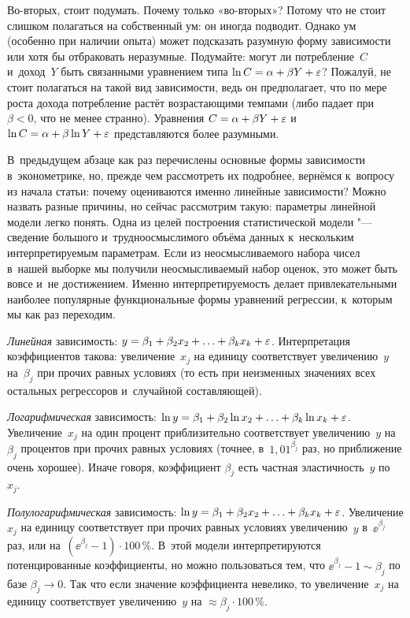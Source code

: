 \documentclass[11pt]{article}
\begin{document}
Во-вторых, стоит подумать. Почему только «во-вторых»? Потому что не стоит слишком полагаться на собственный ум: он иногда подводит. Однако ум (особенно при наличии опыта) может подсказать разумную форму зависимости или хотя бы отбраковать неразумные. Подумайте: могут ли потребление~$C$ и~доход~$Y$ быть связанными уравнением типа $\ln C = \alpha + \beta Y + \varepsilon$? Пожалуй, не стоит полагаться на такой вид зависимости, ведь он предполагает, что по мере роста дохода потребление растёт возрастающими темпами (либо падает при $\beta<0$, что не менее странно). Уравнения $C = \alpha + \beta Y + \varepsilon$ и~$\ln C = \alpha + \beta \ln Y + \varepsilon$ представляются более разумными.

В~предыдущем абзаце как раз перечислены основные формы зависимости в~эконометрике, но, прежде чем рассмотреть их подробнее, вернёмся к~вопросу из начала статьи: почему оцениваются именно линейные зависимости? Можно назвать разные причины, но сейчас рассмотрим такую: параметры линейной модели легко понять. Одна из целей построения статистической модели "--- сведение большого и~трудноосмыслимого объёма данных к~нескольким интерпретируемым параметрам. Если из неосмысливаемого набора чисел в~нашей выборке мы получили неосмысливаемый набор оценок, это может быть вовсе и~не достижением. Именно интерпретируемость делает привлекательными наиболее популярные функциональные формы уравнений регрессии, к~которым мы как раз переходим.

\textit{Линейная} зависимость: $y = \beta_1 + \beta_2 x_2 + \ldots + \beta_k x_k + \varepsilon$. Интерпретация коэффициентов такова: увеличение~$x_j$ на единицу соответствует увеличению~$y$ на~$\beta_j$ при прочих равных условиях (то есть при неизменных значениях всех остальных регрессоров и~случайной составляющей). 

\textit{Логарифмическая} зависимость: $\ln y = \beta_1 + \beta_2 \ln x_2 + \ldots + \beta_k \ln x_k + \varepsilon$. Увеличение~$x_j$ на один процент приблизительно соответствует увеличению~$y$ на~$\beta_j$ процентов при прочих равных условиях (точнее, в~$1{,}01^{\beta_j}$ раз, но приближение очень хорошее). Иначе говоря, коэффициент $\beta_j$ есть частная эластичность~$y$ по~$x_j$.

\textit{Полулогарифмическая }зависимость: $\ln y = \beta_1 + \beta_2 x_2 + \ldots + \beta_k x_k + \varepsilon$. Увеличение $x_j$ на единицу соответствует при прочих равных условиях увеличению~$y$ в~$\ee^{\beta_j}$ раз, или на~$(\ee^{\beta_j}-1)\cdot 100\,\%$. В~этой модели интерпретируются потенцированные коэффициенты, но можно пользоваться тем, что $\ee^{\beta_j} - 1 \sim \beta_j$ по базе $\beta_j \to 0$. Так что если значение коэффициента невелико, то увеличение~$x_j$ на единицу соответствует увеличению~$y$ на $\approx \beta_j \cdot 100\,\%$.
\end{document}
